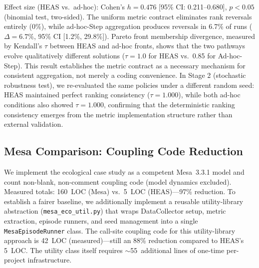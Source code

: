 \documentclass{wscpaperproc}
\begin{document}
Effect size (HEAS vs.\ ad-hoc): Cohen's $h = 0.476$ [95\% CI: 0.211--0.680],
$p < 0.05$ (binomial test, two-sided). The uniform metric contract eliminates
rank reversals entirely (0\%), while ad-hoc-Step aggregation produces reversals in 6.7\%
of runs ($\Delta = 6.7\%$, 95\% CI [1.2\%, 29.8\%]). Pareto front membership divergence,
measured by Kendall's $\tau$ between HEAS and ad-hoc fronts, shows that the two
pathways evolve qualitatively different solutions ($\tau = 1.0$ for HEAS vs.\ 0.85 for
Ad-hoc-Step). This result establishes the metric contract as a necessary mechanism for consistent
aggregation, not merely a coding convenience. In Stage 2 (stochastic robustness test), we
re-evaluated the same policies under a different random seed: HEAS maintained perfect
ranking consistency ($\tau = 1.000$), while both ad-hoc conditions also showed $\tau = 1.000$,
confirming that the deterministic ranking consistency emerges from the metric implementation
structure rather than external validation.

\subsection{Mesa Comparison: Coupling Code Reduction}
\label{sec:mesa-comparison}

We implement the ecological case study as a competent Mesa~3.3.1 model and
count non-blank, non-comment coupling code (model dynamics excluded).
Measured totals: 160~LOC (Mesa) vs.\ 5~LOC (HEAS)---97\% reduction.
To establish a fairer baseline, we additionally implement a reusable
utility-library abstraction (\texttt{mesa\_eco\_util.py}) that wraps
DataCollector setup, metric extraction, episode runners, and seed management
into a single \texttt{MesaEpisodeRunner} class. The call-site coupling code
for this utility-library approach is 42~LOC (measured)---still an 88\%
reduction compared to HEAS's 5~LOC. The utility class itself requires
$\sim$55~additional lines of one-time per-project infrastructure.
\end{document}
